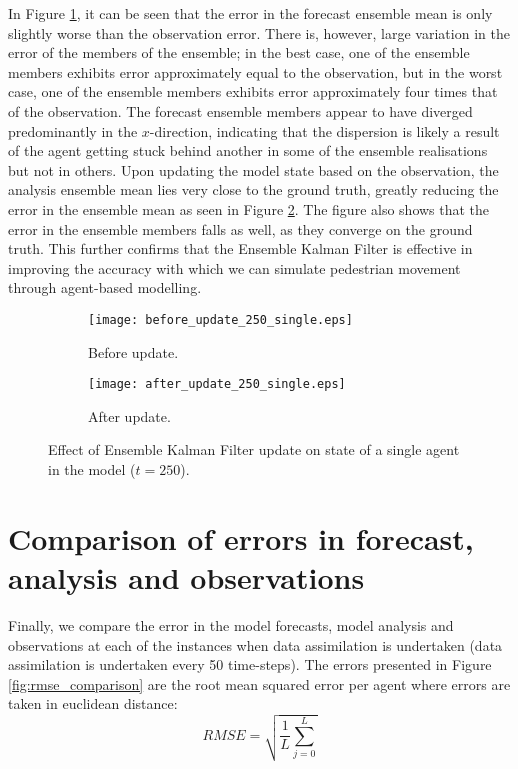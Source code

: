 In Figure \ref{fig:abm_before_single}, it can be seen that the error in the
forecast ensemble mean is only slightly worse than the observation error.
There is, however, large variation in the error of the members of the ensemble;
in the best case, one of the ensemble members exhibits error approximately equal
to the observation, but in the worst case, one of the ensemble members exhibits
error approximately four times that of the observation.
The forecast ensemble members appear to have diverged predominantly in the
$x$-direction, indicating that the dispersion is likely a result of the agent
getting stuck behind another in some of the ensemble realisations but not in
others.
Upon updating the model state based on the observation, the analysis ensemble
mean lies very close to the ground truth, greatly reducing the error in the
ensemble mean as seen in Figure \ref{fig:abm_after_single}.
The figure also shows that the error in the ensemble members falls as well, as
they converge on the ground truth.
This further confirms that the Ensemble Kalman Filter is effective in improving
the accuracy with which we can simulate pedestrian movement through agent-based
modelling.

\begin{figure}[h]
    \centering
    \begin{subfigure}[h]{\textwidth}
        \texttt{[image: before\_update\_250\_single.eps]}
        \caption{Before update.}\label{fig:abm_before_single}
    \end{subfigure}

    \begin{subfigure}[h]{\textwidth}
        \texttt{[image: after\_update\_250\_single.eps]}
        \caption{After update.}\label{fig:abm_after_single}
    \end{subfigure}
    \caption[Effect of Ensemble Kalman Filter update on state of a single agent
    in the model.]{Effect of Ensemble Kalman Filter update on state of a single
    agent in the model ($t=250$).}\label{fig:enkf_abm_single}
\end{figure}

\section{Comparison of errors in forecast, analysis and
observations}\label{sec:results:comparison}

Finally, we compare the error in the model forecasts, model analysis and
observations at each of the instances when data assimilation is undertaken (data
assimilation is undertaken every 50 time-steps).
The errors presented in Figure \ref{fig:rmse_comparison} are the root mean
squared error per agent where errors are taken in euclidean distance:
\begin{equation}
    RMSE = \sqrt{\frac{1}{L} \sum_{j=0}^{L}}
\end{equation}


